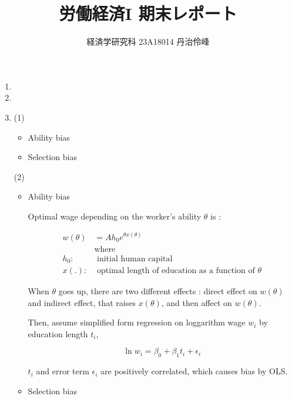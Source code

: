 \documentclass{jsarticle}
\begin{document}
\title{労働経済I 期末レポート}
\author{経済学研究科 23A18014 丹治伶峰}
\date{}
\maketitle

\large

 \begin{enumerate}
 
 \item
 
 
 
 \item
 
 
 
 \item
 
 (1) 
  \begin{itemize}
  
  \item Ability bias
  
  \item Selection bias
  
  \end{itemize}
 
 (2) 
  \begin{itemize}
  
  \item Ability bias
  
  Optimal wage depending on the worker's ability $\theta$ is : 
  
   \begin{align*}
   w(\theta) & = A h_0 e^{\theta x(\theta)} \\
   & \text{where } \\
   h_0 : & \text{ initial human capital} \\
   x(.) : & \text{ optimal length of education as a function of } \theta
   \end{align*}
  
  When $\theta$ goes up, there are two different effects : direct effect on $w(\theta)$ and indirect effect, that raises $x(\theta)$, and then affect on $w(\theta)$.
  
  Then, assume simplified form regression on loggarithm wage $w_i$ by education length $t_i$,
  
  \[ \ln w_i = \beta_0 + \beta_1 t_i + \epsilon_i \]
  
  $t_i$ and error term $\epsilon_i$ are positively correlated, which causes bias by OLS.
  
  \item Selection bias
  

\end{itemize}
\end{enumerate}
\end{document}
